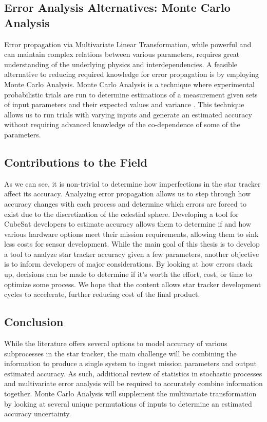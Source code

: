 \subsection*{Error Analysis Alternatives: Monte Carlo Analysis}
\par \qquad Error propagation via Multivariate Linear Transformation, while powerful and can maintain complex relations between various parameters, requires great understanding of the underlying physics and interdependencies.
A feasible alternative to reducing required knowledge for error propagation is by employing Monte Carlo Analysis.
Monte Carlo Analysis is a technique where experimental probabilistic trials are run to determine estimations of a measurement given sets of input parameters and their expected values and variance \cite{MonteCarloAnalysis}.
This technique allows us to run trials with varying inputs and generate an estimated accuracy without requiring advanced knowledge of the co-dependence of some of the parameters.


\subsection*{Contributions to the Field}
\par \qquad As we can see, it is non-trivial to determine how imperfections in the star tracker affect its accuracy.
Analyzing error propagation allows us to step through how accuracy changes with each process and determine which errors are forced to exist due to the discretization of the celestial sphere.
Developing a tool for CubeSat developers to estimate accuracy allows them to determine if and how various hardware options meet their mission requirements, allowing them to sink less costs for sensor development.
While the main goal of this thesis is to develop a tool to analyze star tracker accuracy given a few parameters, another objective is to inform developers of major considerations.
By looking at how errors stack up, decisions can be made to determine if it's worth the effort, cost, or time to optimize some process.
We hope that the content allows star tracker development cycles to accelerate, further reducing cost of the final product.

\subsection*{Conclusion}
\par \qquad While the literature offers several options to model accuracy of various subprocesses in the star tracker, the main challenge will be combining the information to produce a single system to ingest mission parameters and output estimated accuracy.
As such, additional review of statistics in stochastic processes and multivariate error analysis will be required to accurately combine information together.
Monte Carlo Analysis will supplement the multivariate transformation by looking at several unique permutations of inputs to determine an estimated accuracy uncertainty.

